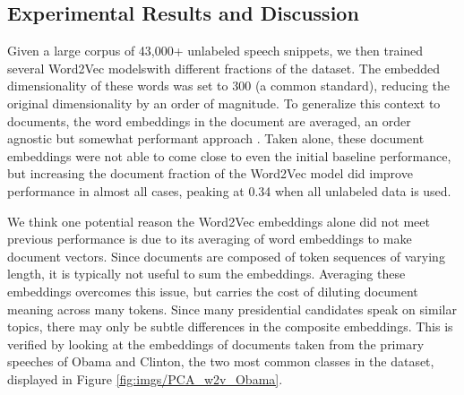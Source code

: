 \documentclass[11pt,a4paper]{article}
\begin{document}
\subsection{Experimental Results and Discussion}%
\label{subseq:experimental_results_and_discussion}

Given a large corpus of 43,000+ unlabeled speech snippets, we then trained several Word2Vec modelswith different fractions of the dataset. The embedded dimensionality of these words was set to 300 (a common standard), reducing the original dimensionality by an order of magnitude. To generalize this context to documents, the word embeddings in the document are averaged, an order agnostic but somewhat performant approach \cite{turney2010frequency}. Taken alone, these document embeddings were not able to come close to even the initial baseline performance, but increasing the document fraction of the Word2Vec model did improve performance in almost all cases, peaking at 0.34 when all unlabeled data is used.

We think one potential reason the Word2Vec embeddings alone did not meet previous performance is due to its averaging of word embeddings to make document vectors. Since documents are composed of token sequences of varying length, it is typically not useful to sum the embeddings. Averaging these embeddings overcomes this issue, but carries the cost of diluting document meaning across many tokens. Since many presidential candidates speak on similar topics, there may only be subtle differences in the composite embeddings. This is verified by looking at the embeddings of documents taken from the primary speeches of Obama and Clinton, the two most common classes in the dataset, displayed in Figure \ref{fig:imgs/PCA_w2v_Obama}. 
\end{document}
